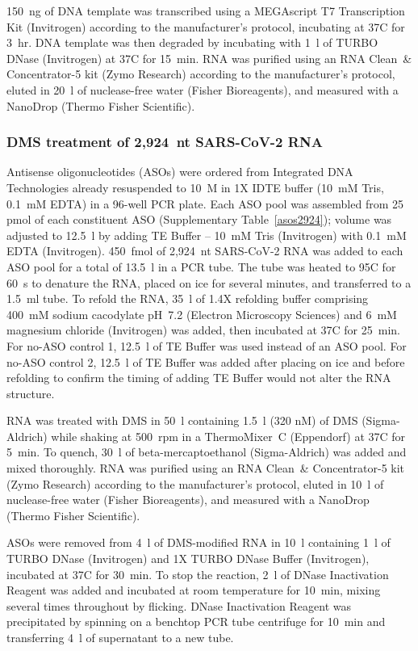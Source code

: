 \documentclass[main.tex]{subfiles}
\begin{document}
150~ng of DNA template was transcribed using a MEGAscript T7 Transcription Kit (Invitrogen) according to the manufacturer's protocol, incubating at 37\textdegree C for 3~hr.
DNA template was then degraded by incubating with 1~\textmu l of TURBO DNase (Invitrogen) at 37\textdegree C for 15~min.
RNA was purified using an RNA Clean~\& Concentrator-5 kit (Zymo Research) according to the manufacturer's protocol, eluted in 20~\textmu l of nuclease-free water (Fisher Bioreagents), and measured with a NanoDrop (Thermo Fisher Scientific).

\subsubsection{DMS treatment of 2,924~nt SARS-CoV-2 RNA}

Antisense oligonucleotides (ASOs) were ordered from Integrated DNA Technologies already resuspended to 10~\textmu M in 1X IDTE buffer (10~mM Tris, 0.1~mM EDTA) in a 96-well PCR plate.
Each ASO pool was assembled from 25 pmol of each constituent ASO (Supplementary Table~\ref{asos2924}); volume was adjusted to 12.5~\textmu l by adding TE Buffer -- 10~mM Tris (Invitrogen) with 0.1~mM EDTA (Invitrogen).
450~fmol of 2,924~nt SARS-CoV-2 RNA was added to each ASO pool for a total of 13.5~\textmu l in a PCR tube.
The tube was heated to 95\textdegree C for 60~s to denature the RNA, placed on ice for several minutes, and transferred to a 1.5~ml tube.
To refold the RNA, 35~\textmu l of 1.4X refolding buffer comprising 400~mM sodium cacodylate pH~7.2 (Electron Microscopy Sciences) and 6~mM magnesium chloride (Invitrogen) was added, then incubated at 37\textdegree C for 25~min.
For no-ASO control 1, 12.5~\textmu l of TE Buffer was used instead of an ASO pool.
For no-ASO control 2, 12.5~\textmu l of TE Buffer was added after placing on ice and before refolding to confirm the timing of adding TE Buffer would not alter the RNA structure.

RNA was treated with DMS in 50~\textmu l containing 1.5~\textmu l (320 nM) of DMS (Sigma-Aldrich) while shaking at 500~rpm in a ThermoMixer~C (Eppendorf) at 37\textdegree C for 5~min.
To quench, 30~\textmu l of beta-mercaptoethanol (Sigma-Aldrich) was added and mixed thoroughly.
RNA was purified using an RNA Clean~\& Concentrator-5 kit (Zymo Research) according to the manufacturer's protocol, eluted in 10~\textmu l of nuclease-free water (Fisher Bioreagents), and measured with a NanoDrop (Thermo Fisher Scientific).

ASOs were removed from 4~\textmu l of DMS-modified RNA in 10~\textmu l containing 1~\textmu l of TURBO DNase (Invitrogen) and 1X TURBO DNase Buffer (Invitrogen), incubated at 37\textdegree C for 30~min.
To stop the reaction, 2~\textmu l of DNase Inactivation Reagent was added and incubated at room temperature for 10~min, mixing several times throughout by flicking.
DNase Inactivation Reagent was precipitated by spinning on a benchtop PCR tube centrifuge for 10~min and transferring 4~\textmu l of supernatant to a new tube.
\end{document}
